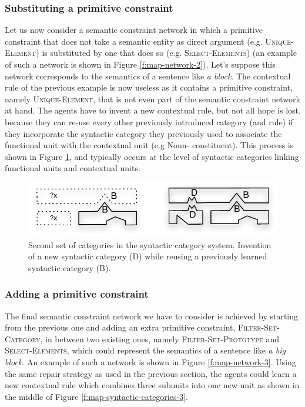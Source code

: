 \subsubsection{Substituting a primitive constraint}

Let us now consider a semantic constraint network in which a primitive
constraint that does not take a semantic entity as direct argument
(e.g. \textsc{Unique-Element}) is substituted by one that does so
(e.g. \textsc{Select-Ele\-ments}) (an example of such a network is shown
in Figure \ref{f:map-network-2}). Let's suppose this network
corresponds to the semantics of a sentence like \textit{a block}. The
contextual rule of the previous example is now useless as it contains
a primitive constraint, namely \textsc{Unique-Element}, that is not
even part of the semantic constraint network at hand. The agents have
to invent a new contextual rule, but not all hope is lost, because
they can re-use every other previously introduced category (and rule)
if they incorporate the syntactic category they previously used to
associate the functional unit with the contextual unit (e.g Noun-
constituent). This process is shown in Figure
\ref{f:map-syntactic-categories-2}, and typically occurs at the level
of syntactic categories linking functional units and contextual units.

\begin{figure}[htbp]
  \begin{center}
    \includegraphics[width=.7\textwidth]{./composition/figures/mapping-2.pdf}
    \caption[Second set of categories in the syntactic category
    system]{Second set of categories in the syntactic category
      system. Invention of a new syntactic category (D) while reusing
      a previously learned syntactic category (B).}
    \label{f:map-syntactic-categories-2}
  \end{center}
\end{figure}

\subsubsection{Adding a primitive constraint}

The final semantic constraint network we have to consider is achieved by starting from the previous one and adding an extra
primitive constraint, \textsc{Filter-Set-Category}, in between two
existing ones, namely \textsc{Filter-Set-Prototype} and
\textsc{Select-Elements}, which could represent the semantics of a
sentence like \textit{a big block}. An example of such a network is shown
in Figure \ref{f:map-network-3}. Using the same repair strategy as
used in the previous section, the agents could learn a new contextual
rule which combines three subunits into one new unit as shown in the
middle of Figure \ref{f:map-syntactic-categories-3}.

